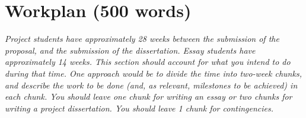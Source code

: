 \documentclass[11pt]{article}
\begin{document}
\section{Workplan (500 words)}
\textsl{Project students have approximately 28 weeks between the submission of 
the proposal, and the submission of the dissertation. Essay students have 
approximately 14 weeks.  This section
should account for what you intend to do during that time. One
approach would be to divide the time into two-week chunks, and 
describe the work to be done (and, as relevant, milestones to be 
achieved) in each chunk. You should leave one chunk for writing an essay or two 
chunks for writing a project dissertation. You should leave 1 chunk for contingencies.} 


\footnotesize{}

\newpage
\appendix
\end{document}
